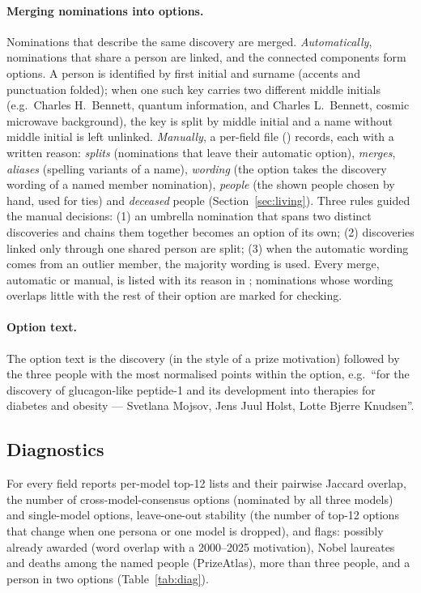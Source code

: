 \documentclass[11pt]{article}
\newcommand{\code}[1]{\texttt{\detokenize{#1}}}
\begin{document}
\paragraph{Merging nominations into options.} Nominations that describe the same discovery are merged.
\emph{Automatically}, nominations that share a person are linked, and the connected components form options. A person
is identified by first initial and surname (accents and punctuation folded); when one such key carries two different
middle initials (e.g.\ Charles H.\ Bennett, quantum information, and Charles L.\ Bennett, cosmic microwave background),
the key is split by middle initial and a name without middle initial is left unlinked. \emph{Manually}, a per-field file
(\code{committee/<field>/merges.yaml}) records, each with a written reason: \emph{splits} (nominations that leave their
automatic option), \emph{merges}, \emph{aliases} (spelling variants of a name), \emph{wording} (the option takes the
discovery wording of a named member nomination), \emph{people} (the shown people chosen by hand, used for ties) and
\emph{deceased} people (Section~\ref{sec:living}). Three rules guided the manual decisions: (1) an umbrella nomination
that spans two distinct discoveries and chains them together becomes an option of its own; (2) discoveries linked only
through one shared person are split; (3) when the automatic wording comes from an outlier member, the majority wording
is used. Every merge, automatic or manual, is listed with its reason in \code{review.md}; nominations whose wording
overlaps little with the rest of their option are marked for checking.

\paragraph{Option text.} The option text is the discovery (in the style of a prize motivation) followed by the three
people with the most normalised points within the option, e.g.\ ``for the discovery of glucagon-like peptide-1 and its
development into therapies for diabetes and obesity --- Svetlana Mojsov, Jens Juul Holst, Lotte Bjerre Knudsen''.

\subsection{Diagnostics}

For every field \code{review.md} reports per-model top-12 lists and their pairwise Jaccard overlap, the number of
cross-model-consensus options (nominated by all three models) and single-model options, leave-one-out stability (the
number of top-12 options that change when one persona or one model is dropped), and flags: possibly already awarded
(word overlap with a 2000--2025 motivation), Nobel laureates and deaths among the named people (PrizeAtlas), more than
three people, and a person in two options (Table~\ref{tab:diag}).
\end{document}
